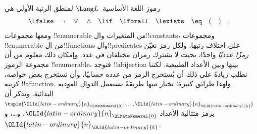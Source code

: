 \documentclass[../../../include/open-logic-section]{subfiles}
\begin{document}

رموز اللغة الأساسية~$\Lang L$ لمنطق الرتبة الأولى هي
\[
\lfalse \quad \lnot \quad \lor \quad \land \quad \lif \quad \lforall
\quad \lexists \quad \eq \quad ( \quad ) \quad ,
\]
ومعها مجموعات !!{enumerable} من المتغيرات
وال!!{constant}s، ومجموعات !!{enumerable}
من ال!!{function}s وال!!{predicate}s على
اختلاف رتبها. ولكل رمز نعيّن \emph{رمزًا عدديًا}
واحدًا، بحيث لا يشترك رمزان مختلفان في عدد.
وإمكان ذلك معلوم من أن مجموعة الرموز
!!{enumerable}، فتوجد !!a{bijection} بينها
وبين الأعداد الطبيعية. لكننا نطلب زيادةً
على ذلك أن يُستخرج الرمز من عدده حسابيًا،
وأن تستخرج بعض خواصه، كرتبة !!a{function}.
ولهذا طرائق كثيرة؛ نختار منها طريقةً
تستعمل الدوال العودية البدائية.
وتذكر أن $\tuple{{\OLId{latin-ordinary}{n}}_{\OLMathNumeral{0}},\dots,{\OLId{latin-ordinary}{n}}_{\OLId{latin-ordinary}{k}}}$ يرمز
متتالية الأعداد ${\OLId{latin-ordinary}{n}}_{\OLMathNumeral{0}}$، و\dots، و${\OLId{latin-ordinary}{n}}_{\OLId{latin-ordinary}{k}}$.
\end{document}
